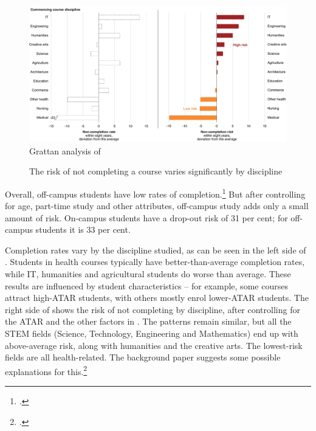                \begin{figure}
                    \caption{The risk of not completing a course varies significantly by discipline\label{fig:18}}
                    \includegraphics[page=1, width=2.15\columnwidth]{atlas/discipline_fullpage.pdf}
                    {Grattan analysis of \textcite{DepartmentofEducationandTraininga}}
                \end{figure}

Overall, off-campus students have low rates of completion.\footcite[][table~1]{DepartmentofEducationandTraining2017} 
But after controlling for age, part-time study and other attributes, off-campus study adds only a small amount of risk. On-campus students have a drop-out risk of 31 per cent; for off-campus students it is 33 per cent.

Completion rates vary by the discipline studied, as can be seen in the left side of . Students in health courses typically have better-than-average completion rates, while IT, humanities and agricultural students do worse than average. These results are influenced by student characteristics -- for example, some courses attract high-ATAR students, with others mostly enrol lower-ATAR students. The right side of  shows the risk of not completing by discipline, after controlling for the ATAR and the other factors in . The patterns remain similar, but all the STEM fields (Science, Technology, Engineering and Mathematics) end up with above-average risk, along with humanities and the creative arts. The lowest-risk fields are all health-related. The background paper suggests some possible explanations for this.\footcite[][chapter~4]{Cherastidtham2018a}


